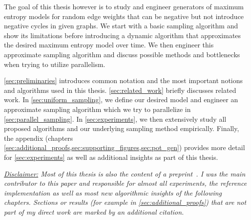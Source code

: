 The goal of this thesis however is to study and engineer generators of maximum entropy models for random edge weights that can be negative but not introduce negative cycles in given graphs.
We start with a basic sampling algorithm and show its limitations before introducing a dynamic algorithm that approximates the desired maximum entropy model over time.
We then engineer this approximate sampling algorithm and discuss possible methods and bottlenecks when trying to utilize parallelism.

\cref{sec:preliminaries} introduces common notation and the most important notions and algorithms used in this thesis.
\cref{sec:related_work} briefly discusses related work.
In \cref{sec:uniform_sampling}, we define our desired model and engineer an approximate sampling algorithm which we try to parallelize in \cref{sec:parallel_sampling}.
In \cref{sec:experiments}, we then extensively study all proposed algorithms and our underlying sampling method empirically.
Finally, the appendix (chapters \cref{sec:additional_proofs,sec:supporting_figures,sec:pot_gen}) provides more detail for \cref{sec:experiments} as well as additional insights as part of this thesis.


\bigskip

\noindent
\textit{
  \underline{Disclaimer:} Most of this thesis is also the content of a preprint~\cite{RNEW}.
  I was the main contributor to this paper and responsible for almost all experiments, the reference implementation as well as most new algorithmic insights of the following chapters.
  Sections or results (for example in \cref{sec:additional_proofs}) that are not part of my direct work are marked by an additional citation.
}
